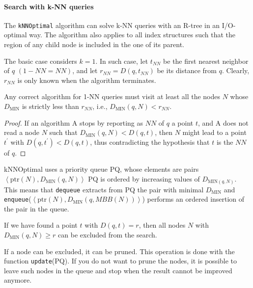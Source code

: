 \paragraph*{Search with k-NN queries}
The \texttt{kNNOptimal} algorithm can solve k-NN queries with an R-tree in an I/O-optimal way. 
The algorithm also applies to all index structures such that the region of any child node is included in the one of its parent. 

The basic case considers $k=1$. 
In such case, let $t_{NN}$ be the first nearest neighbor of $q$ $(1-NN=NN)$, and let $r_{NN}=D(q,t_{NN})$ be its distance from $q$. 
Clearly, $r_{NN}$ is only known when the algorithm terminates. 
\begin{theorem}
    Any correct algorithm for 1-NN queries must visit at least all the nodes $N$ whose $D_{\text{MIN}}$ is strictly less than $r_{NN}$, i.e., $D_{\text{MIN}}(q,N) < r_{NN}$. 
\end{theorem}
\begin{proof}
    If an algorithm A stops by reporting as $NN$ of $q$ a point $t$, and A does not read a node $N$ such that $D_{\text{MIN}}(q,N) < D(q,t)$, then $N$ might lead to a point $t^{'}$ with $D(q,t^{'}) < D(q,t)$, thus contradicting the hypothesis that $t$ is the $NN$ of $q$.
\end{proof}

kNNOptimal uses a priority queue PQ, whose elements are pairs $\left\langle \text{ptr}(N), D_{\text{MIN}}(q,N)\right\rangle $
PQ is ordered by increasing values of $D_{\text{MIN}(q,N)}$. 
This means that \texttt{dequeue} extracts from PQ the pair with minimal $D_{\text{MIN}}$ and \texttt{enqueue}($\left\langle \text{ptr}(N), D_{\text{MIN}}(q,MBB(N)) \right\rangle $) performs an ordered insertion of the pair in the queue. 
\begin{property}
    If we have found a point $t$ with $D(q,t) = r$, then all nodes $N$ with $D_{\text{MIN}}(q,N) \geq r$ can be excluded from the search. 
\end{property}
If a node can be excluded, it can be pruned. 
This operation is done with the function \texttt{update}(PQ). 
If you do not want to prune the nodes, it is possible to leave such nodes in the queue and stop when the result cannot be improved anymore. 

